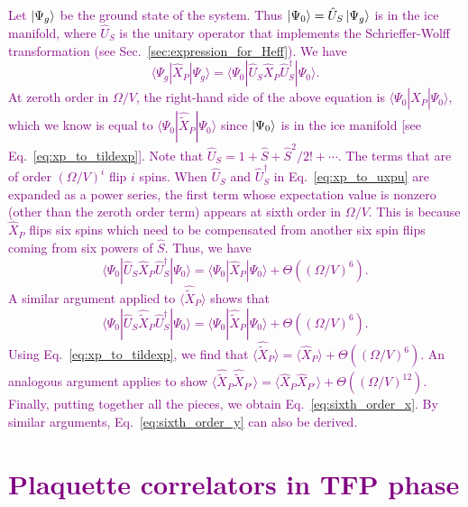 \documentclass[twocolumn,superscriptaddress,amsmath,amssymb,aps,prx,nofootinbib]{revtex4-2}
\newcommand{\newtext}[1]{\textcolor{purple}{#1}}
\begin{document}
\newtext{Let $\ket{\Psi_g}$ be the ground state of the system. Thus $\ket{\Psi_0} = \hat{U}_S \ket{\Psi_g}$ is in the ice manifold, where $\hat{U}_S$ is the unitary operator that implements the Schrieffer-Wolff transformation (see Sec.~\ref{sec:expression_for_Heff}).  
We have
\begin{equation}
\label{eq:xp_to_uxpu}
    \langle \Psi_g | \hat{X}_P  | \Psi_g\rangle =     \langle \Psi_0 | \hat{U}_S \hat{X}_P \hat{U}_S^\dagger| \Psi_0\rangle.
\end{equation}
At zeroth order in $\Omega/V$, the right-hand side of the above equation is $\langle \Psi_0 |  \hat{X}_P | \Psi_0\rangle$, which we know is equal to $ \langle \Psi_0 |\hat{\tilde{X}}_P |\Psi_0 \rangle$ since $\ket{\Psi_0}$ is in the ice manifold [see Eq.~\eqref{eq:xp_to_tildexp}]. 
Note that $\hat{U}_S = 1+\hat{S} + \hat{S}^2/2!+ \cdots$. The terms that are of order $(\Omega/V)^i$ flip $i$ spins.
When $\hat{U}_S$ and $\hat{U}_S^\dagger$ in Eq.~\eqref{eq:xp_to_uxpu} are expanded as a power series, the first term whose expectation value is nonzero (other than the zeroth order term) appears at sixth order in $\Omega/V$.
This is because $\hat{X}_P $ flips six spins which need to be compensated from another six spin flips coming from six powers of $\hat{S}$.
Thus, we have 
\begin{equation}
    \langle\Psi_0 | \hat{U}_S \hat{X}_P \hat{U}_S^\dagger| \Psi_0\rangle = \langle\Psi_0 |  \hat{X}_P | \Psi_0\rangle + \Theta \left((\Omega/V)^6\right).
\end{equation}
A similar argument applied to $ \langle \hat{\tilde{X}}_P \rangle$ shows that 
\begin{equation}
    \langle\Psi_0 | \hat{U}_S \hat{\tilde{X}}_P \hat{U}_S^\dagger| \Psi_0\rangle = \langle\Psi_0 |  \hat{\tilde{X}}_P | \Psi_0\rangle + \Theta \left((\Omega/V)^6\right).
\end{equation}
Using Eq.~\eqref{eq:xp_to_tildexp}, we find that $ \langle  \hat{\tilde{X}}_P \rangle = \langle  \hat{X}_P \rangle + \Theta \left((\Omega/V)^6\right)$. 
An analogous argument applies to show  $ \langle  \hat{\tilde{X}}_P \hat{\tilde{X}}_{P'}\rangle = \langle  \hat{X}_P\hat{X}_{P'} \rangle + \Theta \left((\Omega/V)^{12}\right)$. Finally, putting together all the pieces, we obtain Eq.~\eqref{eq:sixth_order_x}. 
By similar arguments, Eq.~\eqref{eq:sixth_order_y} can also be derived.}

\section{\newtext{Plaquette correlators in TFP phase}}
\label{app:plaquette_TFP}
\end{document}
